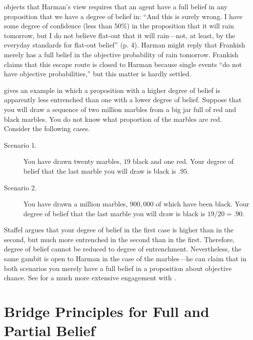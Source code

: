 \citet{frankish2009partial} objects that Harman's view requires that an agent
have a full belief in any proposition that we have a degree of belief in: ``And
this is surely wrong. I have some degree of confidence (less than $50\%$) in the
proposition that it will rain tomorrow, but I do not believe flat-out that it
will rain---not, at least, by the everyday standards for flat-out belief'' (p.
4). Harman might reply that Frankish merely has a full belief in the objective
probability of rain tomorrow. Frankish claims that this escape route is closed
to Harman because single events ``do not have objective probabilities,'' but
this matter is hardly settled.

\citet{staffel2013can} gives an example in which a proposition with a higher
degree of belief is apparently less entrenched than one with a lower degree of
belief. Suppose that you will draw a sequence of two million marbles from a big
jar full of red and black marbles. You do not know what proportion of the
marbles are red. Consider the following cases.
\begin{description}
\item[Scenario 1.] You have drawn twenty marbles, $19$ black and one red. Your
degree of belief that the last marble you will draw is black is $.95$. 
\item[Scenario 2.] You have drawn a million marbles, $900,000$ of which have
been black. Your degree of belief that the last marble you will draw is black is
$19/20=.90$. 
\end{description}
Staffel argues that your degree of belief in the first case is higher than in
the second, but much more entrenched in the second than in the first. Therefore,
degree of belief cannot be reduced to degree of entrenchment. Nevertheless, the
same gambit is open to Harman in the case of the marbles---he can claim that in
both scenarios you merely have a full belief in a proposition about objective
chance. See \citet{staffel2013can} for a much more extensive engagement with
\citet{harman1986change}. 



\section{Bridge Principles for Full and Partial Belief}\label{genin-sec-6}

